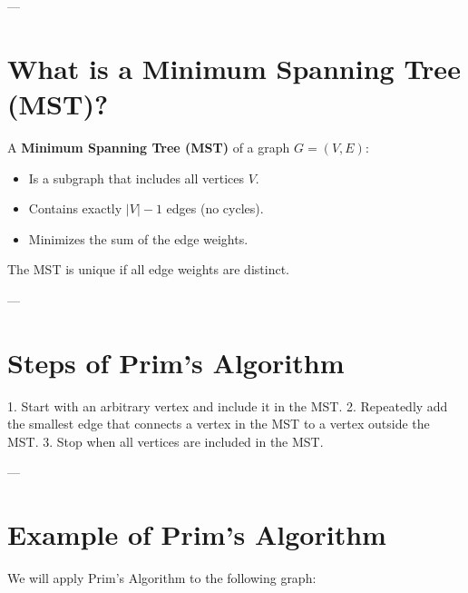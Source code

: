 \documentclass[a4paper,12pt]{article}
\begin{document}
---

\section*{What is a Minimum Spanning Tree (MST)?}

A \textbf{Minimum Spanning Tree (MST)} of a graph \( G = (V, E) \):
\begin{itemize}
    \item Is a subgraph that includes all vertices \( V \).
    \item Contains exactly \( |V| - 1 \) edges (no cycles).
    \item Minimizes the sum of the edge weights.
\end{itemize}

The MST is unique if all edge weights are distinct.

---

\section*{Steps of Prim's Algorithm}

\begin{tcolorbox}[colback=blue!5, colframe=blue!75!black, title=Algorithm Steps]
1. Start with an arbitrary vertex and include it in the MST.
2. Repeatedly add the smallest edge that connects a vertex in the MST to a vertex outside the MST.
3. Stop when all vertices are included in the MST.
\end{tcolorbox}

---

\section*{Example of Prim's Algorithm}

We will apply Prim's Algorithm to the following graph:

\begin{center}
\end{center}
\end{document}
